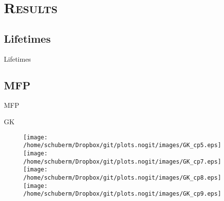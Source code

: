 \documentclass[xcolor=x11names,compress]{beamer}
\renewcommand{\(}{\begin{columns}}
\renewcommand{\)}{\end{columns}}
\newcommand{\<}[1]{\begin{column}{#1}}
\renewcommand{\>}{\end{column}}
\begin{document}
\section{\scshape Results}
\subsection{Lifetimes}
\begin{frame}{Lifetimes}
\begin{figure}[!h]
\begin{center}
\renewcommand{\figure}{Fig.}
\label{fig:lifetimes}
\end{center}
\end{figure}
\end{frame}

\subsection{MFP}
\begin{frame}{MFP}
\begin{figure}[!h]
\begin{center}
\renewcommand{\figure}{Fig.}
\label{fig:sed}
\end{center}
\end{figure}
\end{frame}

\begin{frame}{GK}

\begin{figure}%
\begin{center}
\texttt{[image: /home/schuberm/Dropbox/git/plots.nogit/images/GK\_cp5.eps]} \hspace{0.05\textwidth}%
\texttt{[image: /home/schuberm/Dropbox/git/plots.nogit/images/GK\_cp7.eps]} \\[2em]
\texttt{[image: /home/schuberm/Dropbox/git/plots.nogit/images/GK\_cp8.eps]} \hspace{0.05\textwidth}%
\texttt{[image: /home/schuberm/Dropbox/git/plots.nogit/images/GK\_cp9.eps]} \par
\end{center}
\end{figure}

\end{frame}
\end{document}
